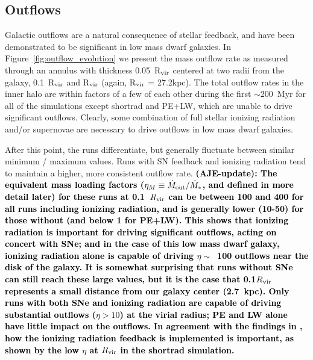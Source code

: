 \documentclass[twocolumn]{aastex62}
\newcommand{\changed}[1]{\textcolor{black}{\textbf{(AJE-update): #1}}}
\begin{document}
\subsection{Outflows}
\label{sec:outflows}

Galactic outflows are a natural consequence of stellar feedback, and have been demonstrated to be significant in low mass dwarf galaxies. In Figure~\ref{fig:outflow_evolution} we present the mass outflow rate as measured through an annulus with thickness 0.05~R$_{\rm vir}$ centered at two radii from the galaxy, 0.1~R$_{\rm vir}$ and R$_{\rm vir}$ (again, R$_{\rm vir}$ = 27.2kpc). The total outflow rates in the inner halo are within factors of a few of each other during the first $\sim$200~Myr for all of the simulations except shortrad and PE+LW, which are unable to drive significant outflows. Clearly, some combination of full stellar ionizing radiation and/or supernovae are necessary to drive outflows in low mass dwarf galaxies. 

After this point, the runs differentiate, but generally fluctuate between similar minimum / maximum values. Runs with SN feedback and ionizing radiation tend to maintain a higher, more consistent outflow rate. \changed{The equivalent mass loading factors ($\eta_M \equiv \dot{M}_{\rm out} / \dot{M}_{\rm *}$, and defined in more detail later) for these runs at 0.1~$R_{\rm vir}$ can be between 100 and 400 for all runs including ionizing radiation, and is generally lower (10-50) for those without (and below 1 for PE+LW). This shows that ionizing radiation is important for driving significant outflows, acting on concert with SNe; and in the case of this low mass dwarf galaxy, ionizing radiation alone is capable of driving $\eta \sim$~100 outflows near the disk of the galaxy. It is somewhat surprising that runs without SNe can still reach these large values, but it is the case that 0.1$R_{\rm vir}$ represents a small distance from our galaxy center (2.7~kpc). Only runs with both SNe and ionizing radiation are capable of driving substantial outflows ($\eta > 10$) at the virial radius; PE and LW alone have little impact on the outflows. In agreement with the findings in \citet{Emerick2018a}, how the ionizing radiation feedback is implemented is important, as shown by the low $\eta$ at $R_{\rm vir}$ in the shortrad simulation.}
\end{document}
